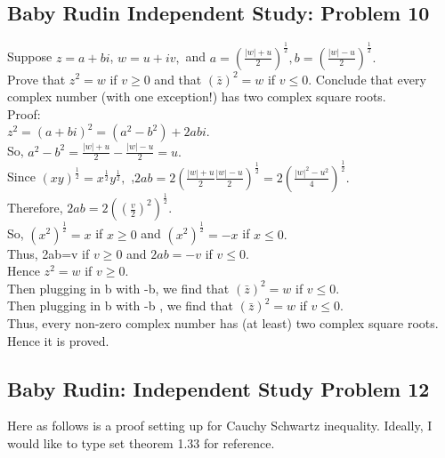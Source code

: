 \subsection*{Baby Rudin Independent Study: Problem 10}
Suppose $z= a+bi$, $w=u+iv,$ and $a= \left(\frac{|w|+u}{2} \right)^\frac{1}{2}, b= \left(\frac{|w|-u}{2} \right)^\frac{1}{2}.$ \\ 
Prove that $z^2 =w$ if $v\geq 0$ and that $(\bar{z})^2=w$ if $v \leq 0.$ Conclude that every complex number (with one exception!) has two complex square roots. \\ 
Proof: \\ 
$z^2= (a+bi)^2= (a^2-b^2)+2abi.$\\
So, $a^2-b^2= \frac{|w|+u}{2}- \frac{|w|-u}{2}=u.$\\
Since $(xy)^\frac{1}{2}= x^\frac{1}{2} y^\frac{1}{2},$ ,$2ab= 2 \left( \frac{|w|+u}{2} \frac{|w|-u}{2}\right)^\frac{1}{2}= 2 \left( \frac{|w|^2 -u^2}{4}\right)^\frac{1}{2}.$\\
Therefore, $2ab = 2 \left( \left(\frac{v}{2} \right)^2 \right)^\frac{1}{2}.$ \\ 
So, $(x^2)^\frac{1}{2} =x$ if $x \geq 0$ and $(x^2)^\frac{1}{2}= -x$ if $x \leq 0.$ 
\\Thus, 2ab=v if $v \geq 0$ and $2ab= -v$ if $v \leq 0.$ \\ 
Hence $z^2 =w$ if $v \geq 0.$ \\ 
Then plugging in b with -b, we find that $( \bar{z})^2=w$ if $v \leq 0.$ \\ 
Then plugging in b with -b , we find that $(\bar{z})^2=w $ if $v \leq 0. $ \\ 
Thus, every non-zero complex number has (at least) two complex square roots. Hence it is proved. 


\subsection*{Baby Rudin: Independent Study Problem 12}

Here as follows is a proof setting up for Cauchy Schwartz inequality. Ideally, I would like to type set theorem 1.33 for reference. 
